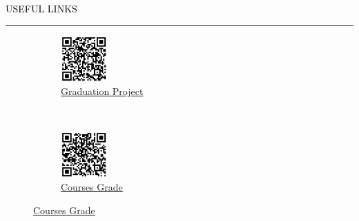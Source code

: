 \documentclass{resume} %
\renewenvironment{rSection}[1]{
\sectionskip
\textcolor{black}{\MakeUppercase{#1}}
\sectionlineskip
\hrule
\begin{list}{}{
\setlength{\leftmargin}{1.5em}
}
\item[]
}{
\end{list}
}
\begin{document}
\begin{rSection}{Useful Links}  
\begin{figure}[H]
    \centering
    \begin{subfigure}[t]{0.5\textwidth}
        \centering
        \includegraphics[height=0.7in]{GraduationProject.jpg}
        \caption{\href{https://drive.google.com/file/d/1vL6V7qEHOOi3-hYtSzS2O25Ldthgse1i/view?usp=sharing}{\color{blue}Graduation Project}}
    \end{subfigure}%
    ~ 
    \begin{subfigure}[t]{0.5\textwidth}
        \centering
        \includegraphics[height=0.7in]{CoursesDegree.jpg}
        \caption{\href{https://drive.google.com/file/d/1F50DDXvgqMtAoCs6Qjr5yMD2jWmPWW3m/view?usp=drive_link}{\color{blue}Courses Grade}}
    \end{subfigure}
\end{figure}
\end{rSection}
\end{document}
